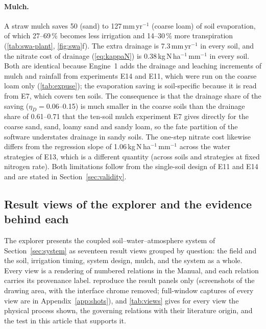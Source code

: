 \documentclass[preprint,12pt]{elsarticle}
\begin{document}
\paragraph{Mulch.} A straw mulch saves 50 (sand) to 127\,mm\,yr$^{-1}$ (coarse loam) of soil evaporation, of which 27--69\,\% becomes less irrigation and 14--30\,\% more transpiration (\cref{tab:swa-plant}, \cref{fig:swa}f). The extra drainage is 7.3\,mm\,yr$^{-1}$ in every soil, and the nitrate cost of drainage (\cref{eq:kappaN}) is 0.38\,kg\,N\,ha$^{-1}$\,mm$^{-1}$ in every soil. Both are identical because Engine~1 adds the drainage and leaching increments of mulch and rainfall from experiments E14 and E11, which were run on the coarse loam only (\cref{tab:expuse}); the evaporation saving is soil-specific because it is read from E7, which covers ten soils. The consequence is that the drainage share of the saving ($\eta_D=0.06$--0.15) is much smaller in the coarse soils than the drainage share of 0.61--0.71 that the ten-soil mulch experiment E7 gives directly for the coarse sand, sand, loamy sand and sandy loam, so the fate partition of the software understates drainage in sandy soils. The one-step nitrate cost likewise differs from the regression slope of 1.06\,kg\,N\,ha$^{-1}$\,mm$^{-1}$ across the water strategies of E13, which is a different quantity (across soils and strategies at fixed nitrogen rate). Both limitations follow from the single-soil design of E11 and E14 and are stated in Section~\ref{sec:validity}.


\subsection{Result views of the explorer and the evidence behind each}
\label{sec:views}
The explorer presents the coupled soil--water--atmosphere system of Section~\ref{sec:system} as seventeen result views grouped by question: the field and the soil, irrigation timing, system design, mulch, and the system as a whole. Every view is a rendering of numbered relations in the Manual, and each relation carries its provenance label.  reproduce the result panels only (screenshots of the drawing area, with the interface chrome removed; full-window captures of every view are in Appendix~\ref{app:shots}), and \cref{tab:views} gives for every view the physical process shown, the governing relations with their literature origin, and the test in this article that supports it.
\end{document}
